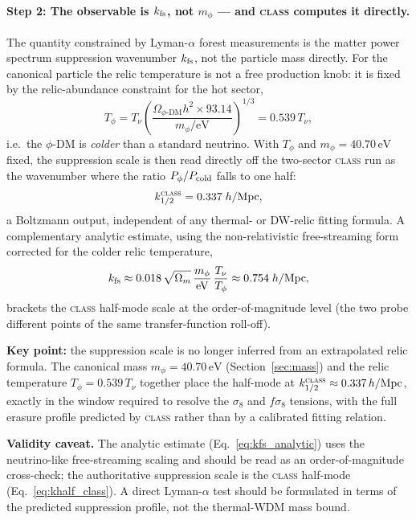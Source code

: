 \documentclass[12pt,a4paper]{article}
\newcommand{\phiDM}{\phi\text{-DM}}
\newcommand{\kfs}{k_{\rm fs}}
\newcommand{\mphi}{m_\phi}
\begin{document}
\paragraph{Step 2: The observable is $\kfs$, not $\mphi$ — and \textsc{class} computes it directly.}
The quantity constrained by Lyman-$\alpha$ forest measurements is the matter
power spectrum suppression wavenumber $\kfs$, not the particle mass directly.
For the canonical particle the relic temperature is not a free production knob:
it is fixed by the relic-abundance constraint for the hot sector,
\begin{equation}
  T_\phi = T_\nu \left(\frac{\Omega_{\phiDM}h^2 \times 93.14}{\mphi/\mathrm{eV}}\right)^{1/3}
         = 0.539\,T_\nu ,
  \label{eq:Tphi_relic}
\end{equation}
i.e.\ the $\phi$-DM is \emph{colder} than a standard neutrino. With $T_\phi$
and $\mphi = 40.70\,\mathrm{eV}$ fixed, the suppression scale is then read
directly off the two-sector \textsc{class} run as the wavenumber where the
ratio $P_{\phi}/P_{\rm cold}$ falls to one half:
\begin{equation}
  k_{1/2}^{\textsc{class}} = 0.337\;h/\mathrm{Mpc},
  \label{eq:khalf_class}
\end{equation}
a Boltzmann output, independent of any thermal- or DW-relic fitting formula.
A complementary analytic estimate, using the non-relativistic free-streaming
form corrected for the colder relic temperature,
\begin{equation}
  \kfs \approx 0.018\,\sqrt{\Omega_m}\,\frac{\mphi}{\mathrm{eV}}\,
        \frac{T_\nu}{T_\phi} \approx 0.754\;h/\mathrm{Mpc},
  \label{eq:kfs_analytic}
\end{equation}
brackets the \textsc{class} half-mode scale at the order-of-magnitude level
(the two probe different points of the same transfer-function roll-off).

\textbf{Key point:} the suppression scale is no longer inferred from an
extrapolated relic formula. The canonical mass $\mphi = 40.70\,\mathrm{eV}$
(Section~\ref{sec:mass}) and the relic temperature $T_\phi = 0.539\,T_\nu$
together place the half-mode at $k_{1/2}^{\textsc{class}}\approx 0.337\,h/\mathrm{Mpc}$,
exactly in the window required to resolve the $\sigma_8$ and $f\sigma_8$
tensions, with the full erasure profile predicted by \textsc{class} rather than
by a calibrated fitting relation.

\textbf{Validity caveat.}  The analytic estimate (Eq.~\ref{eq:kfs_analytic})
uses the neutrino-like free-streaming scaling and should be read as an
order-of-magnitude cross-check; the authoritative suppression scale is the
\textsc{class} half-mode (Eq.~\ref{eq:khalf_class}).
A direct Lyman-$\alpha$ test should be formulated in terms of the predicted
suppression profile, not the thermal-WDM mass bound.
\end{document}
